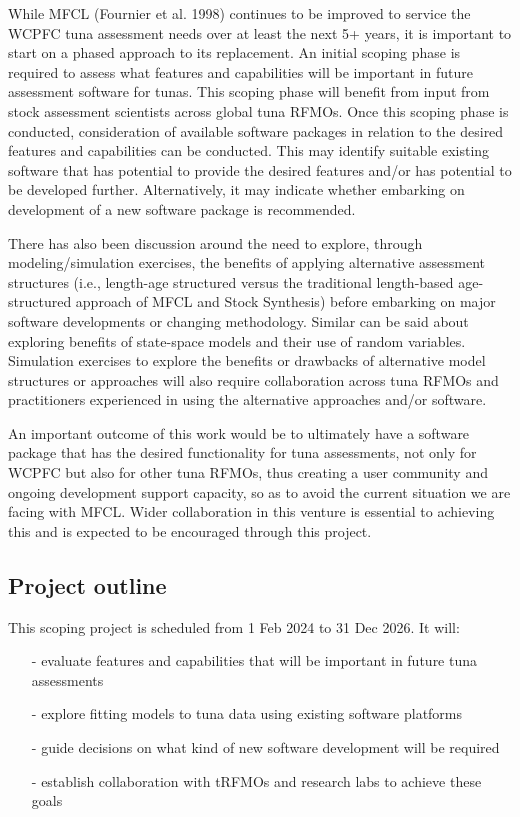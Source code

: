 \documentclass{SCreport}
\begin{document}
While MFCL (Fournier et al. 1998) continues to be improved to service the WCPFC
tuna assessment needs over at least the next 5+ years, it is important to start
on a phased approach to its replacement. An initial scoping phase is required to
assess what features and capabilities will be important in future assessment
software for tunas. This scoping phase will benefit from input from stock
assessment scientists across global tuna RFMOs. Once this scoping phase is
conducted, consideration of available software packages in relation to the
desired features and capabilities can be conducted. This may identify suitable
existing software that has potential to provide the desired features and/or has
potential to be developed further. Alternatively, it may indicate whether
embarking on development of a new software package is recommended.

There has also been discussion around the need to explore, through
modeling/simulation exercises, the benefits of applying alternative assessment
structures (i.e., length-age structured versus the traditional length-based
age-structured approach of MFCL and Stock Synthesis) before embarking on major
software developments or changing methodology. Similar can be said about
exploring benefits of state-space models and their use of random variables.
Simulation exercises to explore the benefits or drawbacks of alternative model
structures or approaches will also require collaboration across tuna RFMOs and
practitioners experienced in using the alternative approaches and/or software.

An important outcome of this work would be to ultimately have a software package
that has the desired functionality for tuna assessments, not only for WCPFC but
also for other tuna RFMOs, thus creating a user community and ongoing
development support capacity, so as to avoid the current situation we are facing
with MFCL. Wider collaboration in this venture is essential to achieving this
and is expected to be encouraged through this project.

\subsection{Project outline}
\label{sec:project-outline}

This scoping project is scheduled from 1 Feb 2024 to 31 Dec 2026. It will:

\begin{itemize}
  \item[-] evaluate features and capabilities that will be important in future
  tuna assessments\\[-4.5ex]
  \item[-] explore fitting models to tuna data using existing software
  platforms\\[-4.5ex]
  \item[-] guide decisions on what kind of new software development will be
  required\\[-4.5ex]
  \item[-] establish collaboration with tRFMOs and research labs to achieve
  these goals
\end{itemize}
\end{document}
